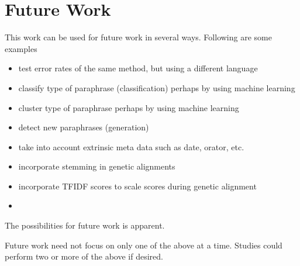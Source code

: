 \section {Future Work}
This work can be used for future work in several ways. Following are some examples 
	\begin {itemize}
		\item test error rates of the same method, but using a different language
		\item classify type of paraphrase (classification) perhaps by using machine learning
		\item cluster type of paraphrase perhaps by using machine learning
		\item detect new paraphrases (generation)
		\item take into account extrinsic meta data such as date, orator, etc.
		\item incorporate stemming in genetic alignments
		\item incorporate TFIDF scores to scale scores during genetic alignment
		\item [Insert more here]
	\end {itemize}
The possibilities for future work is apparent. 

Future work need not focus on only one of the above at a time.  Studies could perform two or more of the above if desired. 

